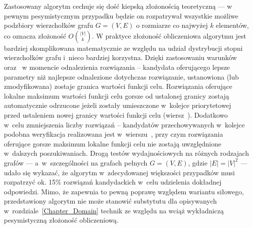 {  Zastosowany algorytm cechuje się dość kiepską złożonością teoretyczną --- w pewnym pesymistycznym przypadku będzie on rozpatrywał wszystkie możliwe podzbiory wierzchołków grafu $G=(V, E)$ o rozmiarze co najwyżej $k$ elementów, co oznacza złożoność $O{|V| \choose k}$.
  W praktyce złożoność obliczeniowa algorytmu jest bardziej skomplikowana matematycznie ze względu na udział dystrybucji stopni wierzchołków grafu i~nieco bardziej korzystna.
  Dzięki zastosowaniu warunków~ oraz~ w momencie odnalezienia rozwiązania -- kandydata oferującego lepsze parametry niż najlepsze odnalezione dotychczas rozwiązanie, ustanowiona (lub zmodyfikowana) zostaje granica wartości funkcji celu.
  Rozwiązania oferujące lokalne maksimum wartości funkcji celu gorsze od ustalonej granicy zostają automatycznie odrzucone jeżeli zostały umieszczone w~kolejce priorytetowej przed ustaleniem nowej granicy wartości funkcji celu (wiersz~).
  Dodatkowo w~celu zmniejszenia liczby rozwiązań -- kandydatów przechowywanych w~kolejce podobna weryfikacja realizowana jest w~wierszu~, przy czym rozwiązania oferujące gorsze maksimum lokalne funkcji celu nie zostają uwzględnione w~dalszych poszukiwaniach.
  Drogą testów wydajnościowych na różnych rodzajach grafów --- a~w~szczególności na grafach pełnych $G=(V, E)$, gdzie $|E|=|V|^2$ --- udało się wykazać, że algorytm w~zdecydowanej większości przypadków musi rozpatrzyć ok. 15\% rozwiązań kandydackich w~celu udzielenia dokładnej odpowiedzi.
  Mimo, że zapewnia to pewną poprawę względem wariantu siłowego, przedstawiony algorytm nie może stanowić substytutu dla opisywanych w~rozdziale~\ref{Chapter_Domain} technik ze względu na wciąż wykładniczą pesymistyczną złożoność obliczeniową.
}